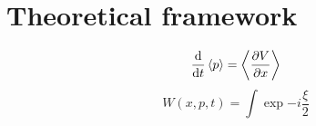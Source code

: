 \chapter{Theoretical framework}

$$\dd{}{t}\mean{p} = \mean{\ddp{V}{x}} $$
\begin{equation}
    W(x,p,t) = \int \exp{-i\frac{\xi}{2}}
\end{equation}